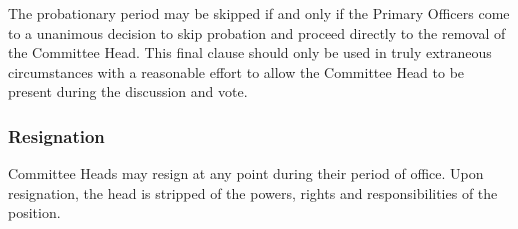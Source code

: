 \documentclass[american]{article}
\begin{document}
The probationary period may be skipped if and only if the Primary Officers come to a unanimous decision to skip probation and proceed directly to the removal of the Committee Head. This final clause should only be used in truly extraneous circumstances with a reasonable effort to allow the Committee Head to be present during the discussion and vote.

\subsubsection{Resignation}
Committee Heads may resign at any point during their period of office. Upon resignation, the head is stripped of the powers, rights and responsibilities of the position.
\end{document}
